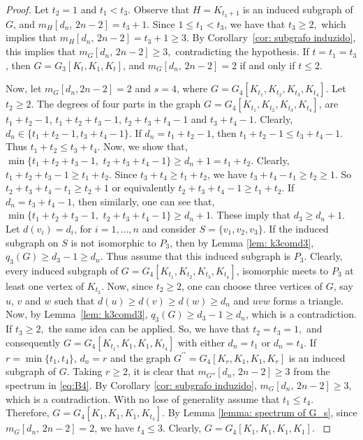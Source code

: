 \documentclass[preprint,12pt]{elsarticle}
\begin{document}
\begin{proof}
Let $t_2=1$ and $t_{1} < t_{3}$. Observe that $H = K_{t_{3} + 1}$ is an induced subgraph of $G$, and $m_{H}[d_n,\, 2n-2] = t_{3} + 1$. Since $1 \leq t_1 < t_3$, we have that $t_3 \geq 2,$ which implies that $m_{H}[d_n,\, 2n-2] = t_{3} + 1 \geq 3.$ By Corollary~\ref{cor: subgrafo induzido}, this implies that
$m_{G}[d_n,\, 2n-2] \ge 3,$
contradicting the hypothesis. If $t = t_1 = t_3$, then $G = G_3[K_t, K_1, K_t]$, and $m_G[d_n,\, 2n-2] = 2$ if and only if $t \leq 2.$


{
Now, let $m_G[d_n, 2n-2] = 2$ and $s=4$, where $G = G_4[K_{t_1}, K_{t_2}, K_{t_3}, K_{t_4}]$. 
Let $t_2 \geq 2$. The degrees of four parts in the graph  $G = G_4[K_{t_1}, K_{t_2}, K_{t_3}, K_{t_4}]$, are ${t_1} + {t_2} - 1$, ${t_1} + {t_2} + {t_3} - 1$, ${t_2} + {t_3} + {t_4} - 1$ and ${t_3} + {t_4} - 1$. Clearly, ${d_n} \in \{ {t_1} + {t_2} - 1,{t_3} + {t_4} - 1\} $. If ${d_n} = {t_1} + {t_2} - 1$, then ${t_1} + {t_2} - 1 \le {t_3} + {t_4} - 1$. Thus ${t_1} + {t_2} \le {t_3} + {t_4}$. Now, we show that, $\min \{ {t_1} + {t_2} + {t_3} - 1,\,\,{t_2} + {t_3} + {t_4} - 1\}  \ge {d_n} + 1 = {t_1} + {t_2}$. Clearly, ${t_1} + {t_2} + {t_3} - 1 \ge {t_1} + {t_2}$. Since  $ {t_3} + {t_4} \ge {t_1} + {t_2}$, we have  $ {t_3} + {t_4} -{t_1}\ge   {t_2}\ge1$. So $ {t_2} + {t_3} + {t_4}-{t_1}\ge   {t_2}+1$ or equivalently ${t_2} + {t_3} + {t_4} - 1 \ge {t_1} + {t_2}$.  If ${d_n} = {t_3} + {t_4} - 1$, then similarly, one can see that, $\min \{ {t_1} + {t_2} + {t_3} - 1,\,\,{t_2} + {t_3} + {t_4} - 1\}  \ge {d_n} + 1$. These imply that $d_3  \geq d_n+1$. Let $d({v_i}) = {d_i}$, for $i = 1, \ldots ,n$ and consider $S = \{ {v_1},{v_2},{v_3}\} $. If the induced subgraph on $S$ is not isomorphic to $P_3$, then by Lemma \ref{lem: k3comd3}, $q_3(G) \geq d_3 - 1 \geq d_n$. Thus assume that this induced subgraph is $P_3$. Clearly, every induced subgraph of $G = G_4[K_{t_1}, K_{t_2}, K_{t_3}, K_{t_4}]$, isomorphic meets to $P_3$ at least one vertex of $K_{t_2}$. Now, since ${t_2} \ge 2$, one can choose three vertices of $G$, say $u$, $v$ and $w$ such that $d(u) \ge d(v) \ge d(w) \ge {d_n}$ and $uvw$ forms a triangle. Now, by Lemma~\ref{lem: k3comd3}, $q_3(G) \geq d_3 - 1 \geq d_n$, which is a contradiction. If $t_3 \geq 2,$ the same idea can be applied. So, we have that $t_2 = t_3 = 1,$ and consequently $G = G_4[K_{t_1}, K_1, K_1, K_{t_4}]$ with either $d_{n} = t_1$ or $d_{n} = t_4$. If $r = \min\{t_1, t_4\}$, $d_n = r$ and the graph $G^{\prime \prime} = G_4[K_{r}, K_1, K_1, K_{r}]$ is an induced subgraph of $G$. Taking $r\geq 2$, it is clear that $m_{G''}[d_n,\, 2n-2] \geq 3$ from the spectrum in \eqref{eq:B4}. By Corollary \ref{cor: subgrafo induzido}, $m_G[d_n,\, 2n-2] \geq 3$, which is a contradiction. With no lose of generality assume that ${t_1} \le {t_4}$.
Therefore, $G = G_4[K_1, K_1, K_1, K_{t_4}]$. By Lemma \ref{lemma: spectrum of G_s}, since $m_G[d_n,\, 2n-2] =2$, we have ${t_4} \le 3$. Clearly, $G = G_4[K_1, K_1, K_1, K_1]$.
}



\end{proof}
\end{document}
